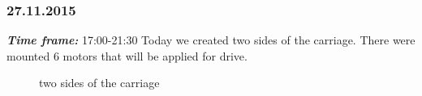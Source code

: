 \subsubsection{27.11.2015}
\textit{\textbf{Time frame:}} 17:00-21:30 \newline
Today we created two sides of the carriage. There were mounted 6 motors that will be applied for drive.

  	\begin{figure}[H]
  		\begin{minipage}[h]{1\linewidth}
  			\caption{two sides of the carriage}
  		\end{minipage}
  	\end{figure}
  	
